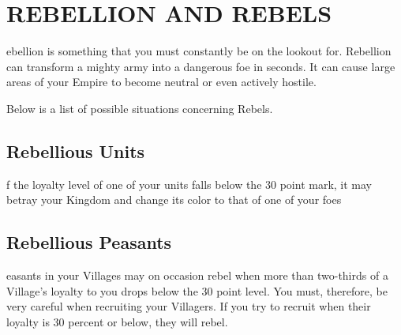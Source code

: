 
\chapter{\textsf{REBELLION AND REBELS}}


ebellion is something that you must constantly be on the lookout for. Rebellion can transform a mighty army into a dangerous foe in seconds. It can cause large areas of your Empire to become neutral or even actively hostile.

Below is a list of possible situations concerning Rebels.

\section{\textsf{Rebellious Units}}


f the loyalty level of one of your units falls below the 30 point mark, it may betray your Kingdom and change its color to that of one of your foes

\section{\textsf{Rebellious Peasants}}



easants in your Villages may on occasion rebel when more than two-thirds of a Village’s loyalty to you drops below the 30 point level. You must, therefore, be very careful when recruiting your Villagers. If you try to recruit when their loyalty is 30 percent or below, they will rebel.


